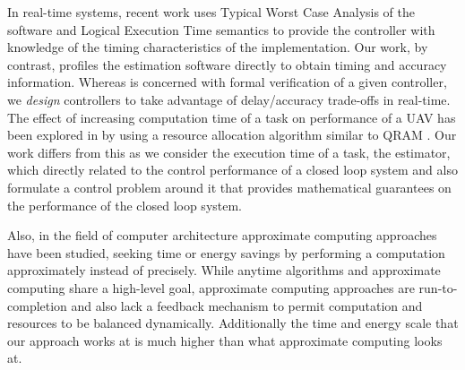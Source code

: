 In real-time systems, recent work \cite{FrehseHQW14_Formal} uses Typical Worst Case Analysis of the software and Logical Execution Time semantics to provide the controller with knowledge of the timing characteristics of the implementation.
Our work, by contrast, profiles the estimation software directly to obtain timing and accuracy information. Whereas \cite{FrehseHQW14_Formal} is concerned with formal verification of a given controller, we \emph{design} controllers to take advantage of delay/accuracy trade-offs in real-time. The effect of increasing computation time of a task on performance of a UAV has been explored in \cite{overbook} by using a resource allocation algorithm similar to QRAM \cite{qram}. Our work differs from this as we consider the execution time of a task, the estimator, which directly related to the control performance of a closed loop system and also formulate a control problem around it that provides mathematical guarantees on the performance of the closed loop system.

Also, in the field of computer architecture approximate computing approaches \cite{loop-perf,rely,npu} have been studied, seeking time or energy
savings by performing a computation approximately instead of precisely. While
anytime algorithms and approximate computing share a high-level goal,
approximate computing approaches are run-to-completion and also lack a feedback
mechanism to permit computation and resources to be balanced dynamically. Additionally the time and energy scale that our approach works at is much higher than what approximate computing looks at.

